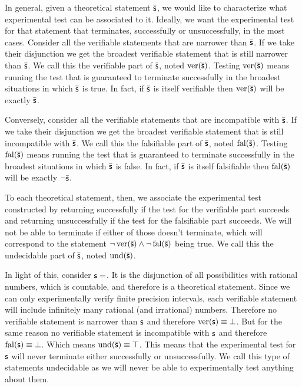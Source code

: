 \documentclass[11pt,letterpaper,fleqn]{memoir} %
\begin{document}
In general, given a theoretical statement $\bar{\mathsf{s}}$, we would like to characterize what experimental test can be associated to it. Ideally, we want the experimental test for that statement that terminates, successfully or unsuccessfully, in the most cases. Consider all the verifiable statements that are narrower than $\bar{\mathsf{s}}$. If we take their disjunction we get the broadest verifiable statement that is still narrower than $\bar{\mathsf{s}}$. We call this the verifiable part of $\bar{\mathsf{s}}$, noted $\operatorname{ver}(\bar{\mathsf{s}})$. Testing $\operatorname{ver}(\bar{\mathsf{s}})$ means running the test that is guaranteed to terminate successfully in the broadest situations in which $\bar{\mathsf{s}}$ is true. In fact, if $\bar{\mathsf{s}}$ is itself verifiable then $\operatorname{ver}(\bar{\mathsf{s}})$ will be exactly $\bar{\mathsf{s}}$.

Conversely, consider all the verifiable statements that are incompatible with $\bar{\mathsf{s}}$. If we take their disjunction we get the broadest verifiable statement that is still incompatible with $\bar{\mathsf{s}}$. We call this the falsifiable part of $\bar{\mathsf{s}}$, noted $\operatorname{fal}(\bar{\mathsf{s}})$. Testing $\operatorname{fal}(\bar{\mathsf{s}})$ means running the test that is guaranteed to terminate successfully in the broadest situations in which $\bar{\mathsf{s}}$ is false. In fact, if $\bar{\mathsf{s}}$ is itself falsifiable then $\operatorname{fal}(\bar{\mathsf{s}})$ will be exactly $\neg\bar{\mathsf{s}}$.

To each theoretical statement, then, we associate the experimental test constructed by returning successfully if the test for the verifiable part succeeds and returning unsuccessfully if the test for the falsifiable part succeeds. We will not be able to terminate if either of those doesn't terminate, which will correspond to the statement $\neg \operatorname{ver}(\bar{\mathsf{s}}) \wedge \neg \operatorname{fal}(\bar{\mathsf{s}})$ being true. We call this the undecidable part of $\bar{\mathsf{s}}$, noted $\operatorname{und}(\bar{\mathsf{s}})$.

In light of this, consider $\mathsf{s}=$. It is the disjunction of all possibilities with rational numbers, which is countable, and therefore is a theoretical statement. Since we can only experimentally verify finite precision intervals, each verifiable statement will include infinitely many rational (and irrational) numbers. Therefore no verifiable statement is narrower than $\mathsf{s}$ and therefore $\operatorname{ver}(\mathsf{s}) \equiv \bot$. But for the same reason no verifiable statement is incompatible with  $\mathsf{s}$ and therefore $\operatorname{fal}(\mathsf{s}) \equiv \bot$. Which means $\operatorname{und}(\bar{\mathsf{s}}) \equiv \top$. This means that the experimental test for $\mathsf{s}$ will never terminate either successfully or unsuccessfully. We call this type of statements undecidable as we will never be able to experimentally test anything about them.
\end{document}
